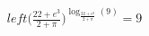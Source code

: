 \documentclass[preview]{standalone}
\begin{document}
\begin{align*}
left( \frac{22+e{^3}}{2+\pi} \big)^{\log_{\frac{22+e{^3}}{2+\pi} }(9)}=9
\end{align*}
\end{document}
